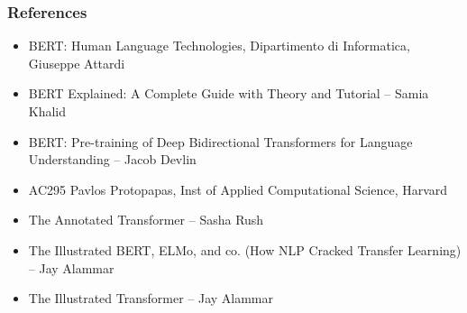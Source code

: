 \begin{frame}[fragile]\frametitle{References}
		\begin{itemize}
		\item BERT: Human Language Technologies, Dipartimento di Informatica, Giuseppe Attardi
		\item BERT Explained: A Complete Guide with Theory and Tutorial – Samia Khalid
		\item BERT: Pre-training of Deep Bidirectional Transformers for Language Understanding – Jacob Devlin
		\item AC295 Pavlos Protopapas, Inst of Applied Computational Science, Harvard
		\item The Annotated Transformer – Sasha Rush
		\item The Illustrated BERT, ELMo, and co. (How NLP Cracked Transfer Learning) – Jay Alammar
		\item The Illustrated Transformer – Jay Alammar
		\end{itemize}
\end{frame}






